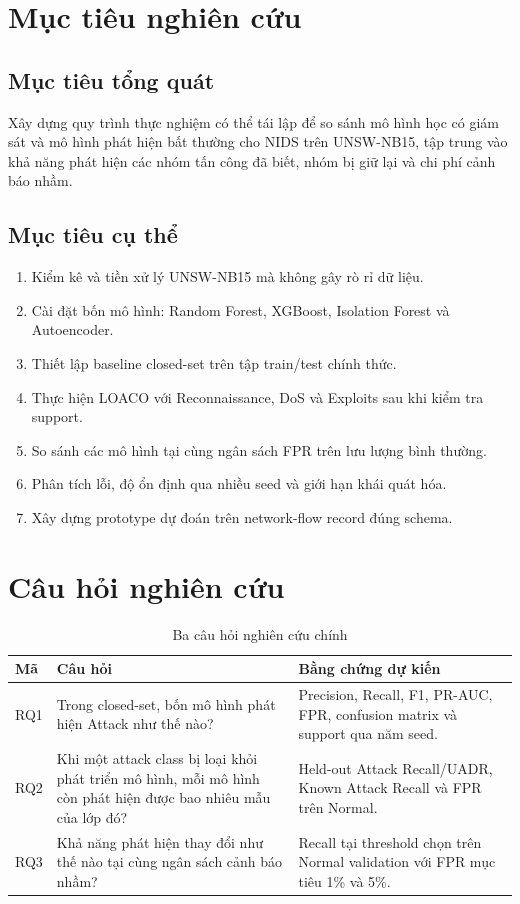 \documentclass[12pt,a4paper,oneside]{report}
\begin{document}
\section{Mục tiêu nghiên cứu}

\subsection{Mục tiêu tổng quát}

Xây dựng quy trình thực nghiệm có thể tái lập để so sánh mô hình học có giám sát và mô hình phát hiện bất thường cho NIDS trên UNSW-NB15, tập trung vào khả năng phát hiện các nhóm tấn công đã biết, nhóm bị giữ lại và chi phí cảnh báo nhầm.

\subsection{Mục tiêu cụ thể}

\begin{enumerate}[label=\arabic*.,leftmargin=1.1cm,itemsep=0.2em]
  \item Kiểm kê và tiền xử lý UNSW-NB15 mà không gây rò rỉ dữ liệu.
  \item Cài đặt bốn mô hình: Random Forest, XGBoost, Isolation Forest và Autoencoder.
  \item Thiết lập baseline closed-set trên tập train/test chính thức.
  \item Thực hiện LOACO với Reconnaissance, DoS và Exploits sau khi kiểm tra support.
  \item So sánh các mô hình tại cùng ngân sách FPR trên lưu lượng bình thường.
  \item Phân tích lỗi, độ ổn định qua nhiều seed và giới hạn khái quát hóa.
  \item Xây dựng prototype dự đoán trên network-flow record đúng schema.
\end{enumerate}

\section{Câu hỏi nghiên cứu}

\begin{table}[H]
\centering
\caption{Ba câu hỏi nghiên cứu chính}
\label{tab:rq}
\begin{tabularx}{\textwidth}{L{1.3cm}Y Y}
\toprule
\textbf{Mã} & \textbf{Câu hỏi} & \textbf{Bằng chứng dự kiến} \\
\midrule
RQ1 & Trong closed-set, bốn mô hình phát hiện Attack như thế nào? & Precision, Recall, F1, PR-AUC, FPR, confusion matrix và support qua năm seed. \\
RQ2 & Khi một attack class bị loại khỏi phát triển mô hình, mỗi mô hình còn phát hiện được bao nhiêu mẫu của lớp đó? & Held-out Attack Recall/UADR, Known Attack Recall và FPR trên Normal. \\
RQ3 & Khả năng phát hiện thay đổi như thế nào tại cùng ngân sách cảnh báo nhầm? & Recall tại threshold chọn trên Normal validation với FPR mục tiêu 1\% và 5\%. \\
\bottomrule
\end{tabularx}
\end{table}
\end{document}
